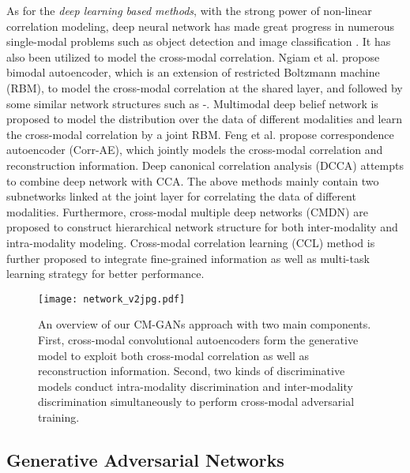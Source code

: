 \documentclass[journal]{IEEEtran}
\begin{document}
As for the \textit{deep learning based methods}, with the strong power of non-linear correlation modeling, deep neural network has made great progress in numerous single-modal problems such as object detection \cite{DBLP:conf/nips/RenHGS15} and image classification \cite{ImageNet2012}. It has also been utilized to model the cross-modal correlation. Ngiam et al. \cite{ngiam32011multimodal} propose bimodal autoencoder, which is an extension of restricted Boltzmann machine (RBM), to model the cross-modal correlation at the shared layer, and followed by some similar network structures such as \cite{kim2012learning}-\cite{DBLP:conf/ijcai/WangCO015}. Multimodal deep belief network \cite{srivastava2012learning} is proposed to model the distribution over the data of different modalities and learn the cross-modal correlation by a joint RBM. Feng et al. \cite{feng12014cross} propose correspondence autoencoder (Corr-AE), which jointly models the cross-modal correlation and reconstruction information. Deep canonical correlation analysis (DCCA) \cite{DBLP:conf/icml/AndrewABL13,DBLP:conf/cvpr/YanM15} attempts to combine deep network with CCA. The above methods mainly contain two subnetworks linked at the joint layer for correlating the data of different modalities. Furthermore, cross-modal multiple deep networks (CMDN) are proposed \cite{DBLP:conf/ijcai/PengHQ16} to construct hierarchical network structure for both inter-modality and intra-modality modeling. Cross-modal correlation learning (CCL) \cite{peng2017ccl} method is further proposed to integrate fine-grained information as well as multi-task learning strategy for better performance.

\begin{figure*}[t]
	\centering
	\begin{minipage}[c]{0.97\linewidth}
		\centering
		\texttt{[image: network\_v2jpg.pdf]}
	\end{minipage}%
	\caption{An overview of our CM-GANs approach with two main components. First, cross-modal convolutional autoencoders form the generative model to exploit both cross-modal correlation as well as reconstruction information. Second, two kinds of discriminative models conduct intra-modality discrimination and inter-modality discrimination simultaneously to perform cross-modal adversarial training.}\label{fig:network}
\end{figure*}

\subsection{Generative Adversarial Networks}
\end{document}
